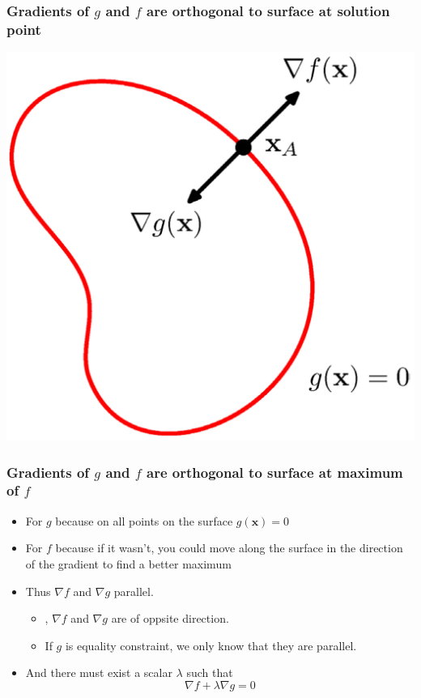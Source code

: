 \documentclass[12pt,notes,mathserif]{beamer}
\newcommand{\red}[1]{ {\color{red}{#1}} }
\begin{document}
\begin{frame}[c]
	\frametitle{Gradients of $g$ and $f$ are orthogonal to surface at solution point}
	\begin{center}
		\includegraphics[width=0.65\linewidth]{fig8/lec827.jpg}
	\end{center}
\end{frame}



\begin{frame}[c]
	\frametitle{Gradients of $g$ and $f$ are orthogonal to surface at maximum of $f$}
	\begin{itemize}
		\item For $g$ because on all points on the surface $g(\mathbf{x})=0$
		\item For $f$ because if it wasn't, you could move along the surface in the direction of the gradient to find a better maximum
		\item Thus $\nabla f$ and $\nabla g$ parallel.    
			\begin{itemize}
				\item \red{If $g$ is inequality constraint}, $\nabla f$ and $\nabla g$ are of oppsite direction.
				\item If $g$ is equality constraint, we only know that they are parallel. 
			\end{itemize} 
		\item And there must exist a scalar $\lambda$ such that
		      \[
			      \nabla f+\lambda \nabla g=0
		      \]
	\end{itemize}
\end{frame}
\end{document}

